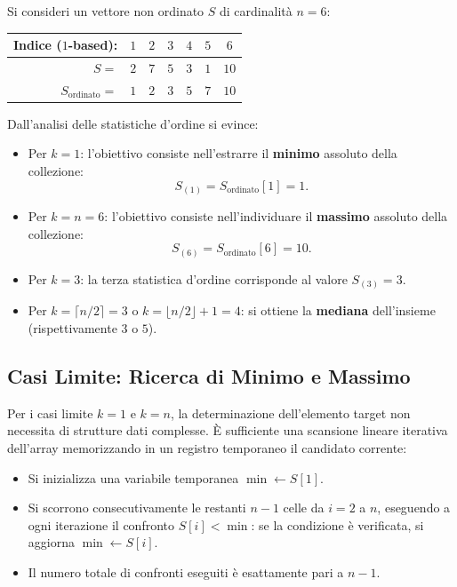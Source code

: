 \begin{example}
Si consideri un vettore non ordinato $S$ di cardinalità $n = 6$:
\begin{center}
\begin{tabular}{rcccccc}
\toprule
\textbf{Indice ($1$-based):} & $1$ & $2$ & $3$ & $4$ & $5$ & $6$ \\
\midrule
$S =$ & $2$ & $7$ & $5$ & $3$ & $1$ & $10$ \\
$S_{\text{ordinato}} =$ & $1$ & $2$ & $3$ & $5$ & $7$ & $10$ \\
\bottomrule
\end{tabular}
\end{center}
Dall'analisi delle statistiche d'ordine si evince:
\begin{itemize}
  \item Per $k = 1$: l'obiettivo consiste nell'estrarre il \textbf{minimo} assoluto della collezione:
  \begin{equation}
    S_{(1)} = S_{\text{ordinato}}[1] = 1.
  \end{equation}
  \item Per $k = n = 6$: l'obiettivo consiste nell'individuare il \textbf{massimo} assoluto della collezione:
  \begin{equation}
    S_{(6)} = S_{\text{ordinato}}[6] = 10.
  \end{equation}
  \item Per $k = 3$: la terza statistica d'ordine corrisponde al valore $S_{(3)} = 3$.
  \item Per $k = \lceil n/2 \rceil = 3$ o $k = \lfloor n/2 \rfloor + 1 = 4$: si ottiene la \textbf{mediana} dell'insieme (rispettivamente $3$ o $5$).
\end{itemize}
\end{example}
\FloatBarrier

\subsection{Casi Limite: Ricerca di Minimo e Massimo}
\label{subsec:selection-boundary-cases}

Per i casi limite $k = 1$ e $k = n$, la determinazione dell'elemento target non necessita di strutture dati complesse. È sufficiente una scansione lineare iterativa dell'array memorizzando in un registro temporaneo il candidato corrente:

\begin{itemize}
  \item Si inizializza una variabile temporanea $\min \leftarrow S[1]$.
  \item Si scorrono consecutivamente le restanti $n - 1$ celle da $i = 2$ a $n$, eseguendo a ogni iterazione il confronto $S[i] < \min$: se la condizione è verificata, si aggiorna $\min \leftarrow S[i]$.
  \item Il numero totale di confronti eseguiti è esattamente pari a $n - 1$.
\end{itemize}

